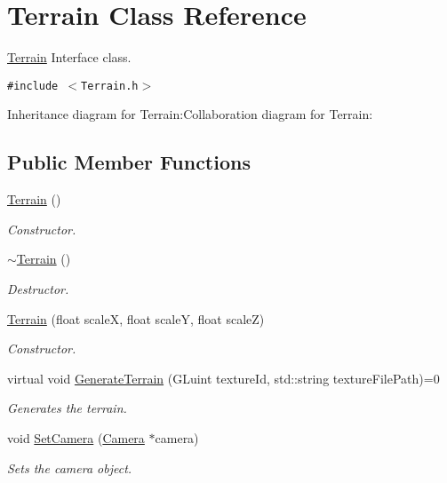 \hypertarget{class_terrain}{
\section{Terrain Class Reference}
\label{class_terrain}
}
\hyperlink{class_terrain}{Terrain} Interface class.  


{\tt \#include $<$Terrain.h$>$}

Inheritance diagram for Terrain:Collaboration diagram for Terrain:\subsection*{Public Member Functions}
\begin{CompactItemize}
\item 
\hyperlink{class_terrain_7160a06ab07a86ed97d23374405e8ef6}{Terrain} ()
\begin{CompactList}\small\item\em Constructor. \item\end{CompactList}\item 
\hyperlink{class_terrain_2f7f0a2aee54886324ccf48a6f321de0}{$\sim$Terrain} ()
\begin{CompactList}\small\item\em Destructor. \item\end{CompactList}\item 
\hyperlink{class_terrain_6ddefba9b991f9d08871bacad4734143}{Terrain} (float scaleX, float scaleY, float scaleZ)
\begin{CompactList}\small\item\em Constructor. \item\end{CompactList}\item 
virtual void \hyperlink{class_terrain_93fa5e9433a77d8f8bbe2a2f6aadf2ab}{GenerateTerrain} (GLuint textureId, std::string textureFilePath)=0
\begin{CompactList}\small\item\em Generates the terrain. \item\end{CompactList}\item 
void \hyperlink{class_terrain_d24a0b962c0bff2328d45c716a4b2788}{SetCamera} (\hyperlink{class_camera}{Camera} $\ast$camera)
\begin{CompactList}\small\item\em Sets the camera object. \item\end{CompactList}\item 

\end{CompactItemize}
